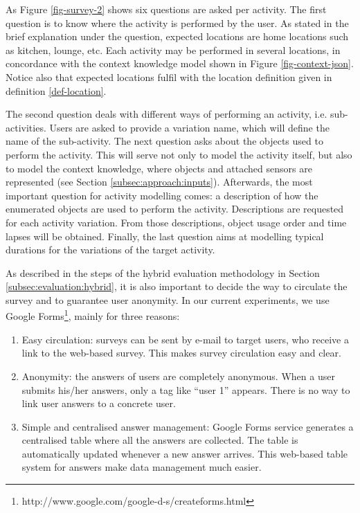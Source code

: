 As Figure \ref{fig-survey-2} shows six questions are asked per activity. The first question is to know where the activity is performed by the user. As stated in the brief explanation under the question, expected locations are home locations such as kitchen, lounge, etc. Each activity may be performed in several locations, in concordance with the context knowledge model shown in Figure \ref{fig-context-json}. Notice also that expected locations fulfil with the location definition given in definition \ref{def-location}.

The second question deals with different ways of performing an activity, i.e. sub-activities. Users are asked to provide a variation name, which will define the name of the sub-activity. The next question asks about the objects used to perform the activity. This will serve not only to model the activity itself, but also to model the context knowledge, where objects and attached sensors are represented (see Section \ref{subsec:approach:inputs}). Afterwards, the most important question for activity modelling comes: a description of how the enumerated objects are used to perform the activity. Descriptions are requested for each activity variation. From those descriptions, object usage order and time lapses will be obtained. Finally, the last question aims at modelling typical durations for the variations of the target activity.

As described in the steps of the hybrid evaluation methodology in Section \ref{subsec:evaluation:hybrid}, it is also important to decide the way to circulate the survey and to guarantee user anonymity. In our current experiments, we use Google Forms\footnote{http://www.google.com/google-d-s/createforms.html}, mainly for three reasons:

\begin{enumerate}
 \item Easy circulation: surveys can be sent by e-mail to target users, who receive a link to the web-based survey. This makes survey circulation easy and clear.
 \item Anonymity: the answers of users are completely anonymous. When a user submits his/her answers, only a tag like ``user 1'' appears. There is no way to link user answers to a concrete user.
 \item Simple and centralised answer management: Google Forms service generates a centralised table where all the answers are collected. The table is automatically updated whenever a new answer arrives. This web-based table system for answers make data management much easier.
\end{enumerate}

